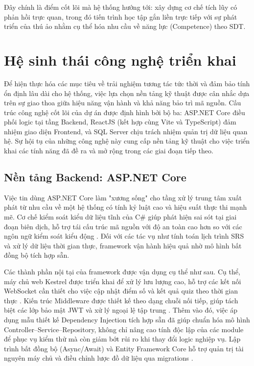Đây chính là điểm cốt lõi mà hệ thống hướng tới: xây dựng cơ chế tích lũy có phản hồi trực quan, trong đó tiến trình học tập gắn liền trực tiếp với sự phát triển của thú ảo nhằm cụ thể hóa nhu cầu về năng lực (Competence) theo SDT.

\section{Hệ sinh thái công nghệ triển khai}

Để hiện thực hóa các mục tiêu về trải nghiệm tương tác tức thời và đảm bảo tính ổn định lâu dài cho hệ thống, việc lựa chọn nền tảng kỹ thuật được cân nhắc dựa trên sự giao thoa giữa hiệu năng vận hành và khả năng bảo trì mã nguồn. Cấu trúc công nghệ cốt lõi của dự án được định hình bởi bộ ba: ASP.NET Core điều phối logic tại tầng Backend, ReactJS (kết hợp cùng Vite và TypeScript) đảm nhiệm giao diện Frontend, và SQL Server chịu trách nhiệm quản trị dữ liệu quan hệ. Sự hội tụ của những công nghệ này cung cấp nền tảng kỹ thuật cho việc triển khai các tính năng đã đề ra và mở rộng trong các giai đoạn tiếp theo.

\subsection{Nền tảng Backend: ASP.NET Core}

Việc tin dùng ASP.NET Core làm "xương sống" cho tầng xử lý trung tâm xuất phát từ nhu cầu về một hệ thống có tính kỷ luật cao và hiệu suất thực thi mạnh mẽ. Cơ chế kiểm soát kiểu dữ liệu tĩnh của C\# giúp phát hiện sai sót tại giai đoạn biên dịch, hỗ trợ tái cấu trúc mã nguồn với độ an toàn cao hơn so với các ngôn ngữ kiểm soát kiểu động \cite{MicrosoftASPNETCore2024}. Đối với các tác vụ như tính toán lịch trình SRS và xử lý dữ liệu thời gian thực, framework vận hành hiệu quả nhờ mô hình bất đồng bộ tích hợp sẵn.

Các thành phần nội tại của framework được vận dụng cụ thể như sau. Cụ thể, máy chủ web Kestrel được triển khai để xử lý lưu lượng cao, hỗ trợ các kết nối WebSocket cần thiết cho việc cập nhật điểm số và kết quả quiz theo thời gian thực \cite{KestrelDocs2024}. Kiến trúc Middleware được thiết kế theo dạng chuỗi nối tiếp, giúp tách biệt các lớp bảo mật JWT và xử lý ngoại lệ tập trung \cite{MiddlewareDocs2024}. Thêm vào đó, việc áp dụng mẫu thiết kế Dependency Injection tích hợp sẵn đã giúp chuẩn hóa mô hình Controller–Service–Repository, không chỉ nâng cao tính độc lập của các module để phục vụ kiểm thử mà còn giảm bớt rủi ro khi thay đổi logic nghiệp vụ. Lập trình bất đồng bộ (Async/Await) và Entity Framework Core hỗ trợ quản trị tài nguyên máy chủ và điều chỉnh lược đồ dữ liệu qua migrations \cite{MicrosoftEFCore2024}.

